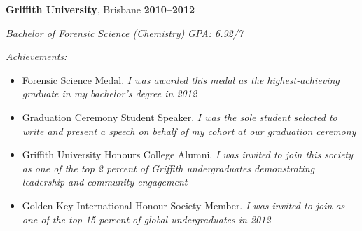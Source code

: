 \textbf{\large Griffith University}, {\large Brisbane} \hfill \textbf{2010--2012} \par
\textit{Bachelor of Forensic Science (Chemistry)} \hfill \textit{GPA: 6.92/7} \par
\vspace{1mm}
\textit{Achievements:} \par
\begin{itemize}
	\item Forensic Science Medal. \textit{I was awarded this medal as the highest-achieving graduate in my bachelor's degree in 2012}
    \item Graduation Ceremony Student Speaker. \textit{I was the sole student selected to write and present a speech on behalf of my cohort at our graduation ceremony}
    \item Griffith University Honours College Alumni. \textit{I was invited to join this society as one of the top 2 percent of Griffith undergraduates demonstrating leadership and community engagement}
    \item Golden Key International Honour Society Member. \textit{I was invited to join as one of the top 15 percent of global undergraduates in 2012}
\end{itemize}\par